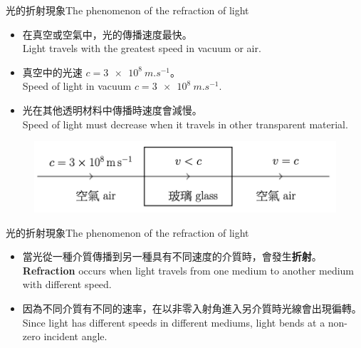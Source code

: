 \documentclass[beamer=true]{standalone}
\begin{document}



\begin{frame}{光的折射現象The phenomenon of the refraction of light}
    \begin{itemize}
        \item 在真空或空氣中，光的傳播速度最快。\\Light travels with the greatest speed in vacuum or air.
        \item 真空中的光速 $c=\qty{3e8}{m.s^{-1}}$。\\Speed of light in vacuum $c=\qty{3e8}{m.s^{-1}}$.
        \item 光在其他透明材料中傳播時速度會減慢。\\Speed of light must decrease when it travels in other transparent material.
        
    \end{itemize}
    \begin{figure}
        \centering
        \includegraphics[width=0.666\linewidth]{assets/21389120782174281age.png}
        
        
    \end{figure}
\end{frame}

\begin{frame}{光的折射現象The phenomenon of the refraction of light}
    \begin{itemize}
        \item 當光從一種介質傳播到另一種具有不同速度的介質時，會發生\textbf{折射}。\\\textbf{Refraction} occurs when light travels from one medium to another medium with different speed.
        \item 因為不同介質有不同的速率，在以非零入射角進入另介質時光線會出現徧轉。\\Since light has different speeds in different mediums, light bends at a non-zero incident angle.
    \end{itemize}

\end{frame}
\end{document}
